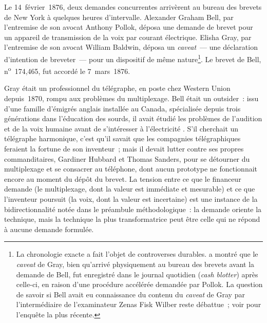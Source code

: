 Le 14~février~1876, deux demandes concurrentes arrivèrent au bureau des brevets de New York à quelques heures d'intervalle. Alexander Graham Bell, par l'entremise de son avocat Anthony Pollok, déposa une demande de brevet pour un appareil de transmission de la voix par courant électrique. Elisha Gray, par l'entremise de son avocat William Baldwin, déposa un \emph{caveat}~--- une déclaration d'intention de breveter~--- pour un dispositif de même nature\footnote{La chronologie exacte a fait l'objet de controverses durables. \textcite{evenson_telephone_2000} a montré que le \emph{caveat} de Gray, bien qu'arrivé physiquement au bureau des brevets avant la demande de Bell, fut enregistré dans le journal quotidien (\emph{cash blotter}) après celle-ci, en raison d'une procédure accélérée demandée par Pollok. La question de savoir si Bell avait eu connaissance du contenu du \emph{caveat} de Gray par l'intermédiaire de l'examinateur Zenas Fisk Wilber reste débattue~; voir \textcite{shulman_telephone_2008} pour l'enquête la plus récente.}. Le brevet de Bell, n\textsuperscript{o}~174,465, fut accordé le 7~mars~1876.

Gray était un professionnel du télégraphe, en poste chez Western Union depuis~1870, rompu aux problèmes du multiplexage. Bell était un outsider~: issu d'une famille d'émigrés anglais installée au Canada, spécialisée depuis trois générations dans l'éducation des sourds, il avait étudié les problèmes de l'audition et de la voix humaine avant de s'intéresser à l'électricité \parencite{bertho_histoire_1984}. S'il cherchait un télégraphe harmonique, c'est qu'il savait que les compagnies télégraphiques feraient la fortune de son inventeur~; mais il devait lutter contre ses propres commanditaires, Gardiner Hubbard et Thomas Sanders, pour se détourner du multiplexage et se consacrer au téléphone, dont aucun prototype ne fonctionnait encore au moment du dépôt du brevet. La tension entre ce que le financeur demande (le multiplexage, dont la valeur est immédiate et mesurable) et ce que l'inventeur poursuit (la voix, dont la valeur est incertaine) est une instance de la bidirectionnalité notée dans le préambule méthodologique~: la demande oriente la technique, mais la technique la plus transformatrice peut être celle qui ne répond à aucune demande formulée.

